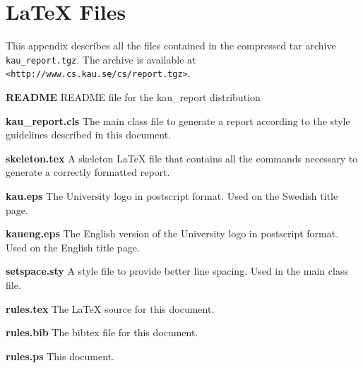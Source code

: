 \documentclass[12pt,twoside]{kau_report}
\begin{document}
\begin{singlespace}


\end{singlespace}

\appendix
\section{LaTeX Files}
This appendix describes all the files contained in the compressed tar
archive {\tt kau\_report.tgz}. The archive is available at {\tt
<http://www.cs.kau.se/cs/report.tgz>}.
\begin{description}
\item{\bf README} README file for the kau\_report distribution
\item{\bf kau\_report.cls} The main class file to generate a report
according to the style guidelines described in this document.
\item {\bf skeleton.tex} A skeleton LaTeX file that contains all the
commands necessary to generate a correctly formatted report.
\item{\bf kau.eps} The University logo in postscript
format. Used on the Swedish title page.
\item{\bf kaueng.eps} The English version of the University logo in
postscript format. Used on the English title page.
\item{\bf setspace.sty} A style file to provide better line spacing.
Used in the main class file.
\item{\bf rules.tex} The LaTeX source for this document.
\item{\bf rules.bib} The bibtex file for this document.
\item{\bf rules.ps} This document.
\end{description}
\end{document}
